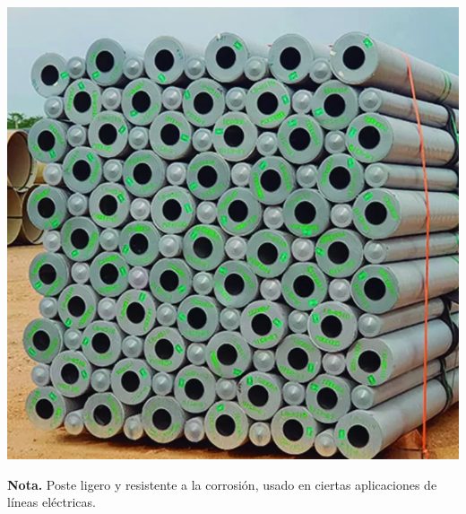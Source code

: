 \begin{minipage}[t]{0.48\textwidth}
    \centering
    \includegraphics[width=\linewidth]{fotosherrajes/poste fibra de vidrio.jpg}
    \footnotesize
    \raggedright
    \textbf{Nota.} Poste ligero y resistente a la corrosión, usado en ciertas aplicaciones de líneas eléctricas.
\end{minipage}

\vspace{1cm}

